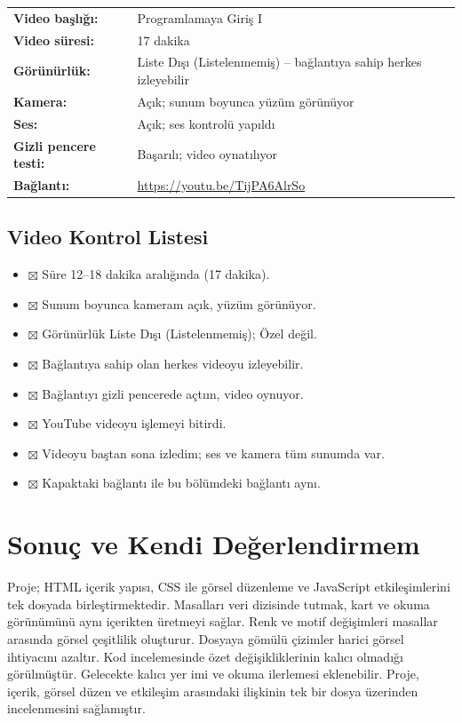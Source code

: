 \documentclass[12pt,a4paper]{article}
\newcommand{\videobasligi}{Programlamaya Giriş I}
\newcommand{\videosuresi}{17 dakika}
\newcommand{\videogorunurlugu}{Liste Dışı (Listelenmemiş) -- bağlantıya sahip herkes izleyebilir}
\newcommand{\youtubelink}{\url{https://youtu.be/TijPA6AlrSo}}
\begin{document}
\begin{center}
\begin{tabular}{@{}lp{9cm}@{}}
\textbf{Video başlığı:} & \videobasligi\\
\textbf{Video süresi:} & \videosuresi\\
\textbf{Görünürlük:} & \videogorunurlugu\\
\textbf{Kamera:} & Açık; sunum boyunca yüzüm görünüyor\\
\textbf{Ses:} & Açık; ses kontrolü yapıldı\\
\textbf{Gizli pencere testi:} & Başarılı; video oynatılıyor\\
\textbf{Bağlantı:} & \youtubelink\\
\end{tabular}
\end{center}

\subsection{Video Kontrol Listesi}
\begin{itemize}[label={}]
\item $\boxtimes$ Süre 12--18 dakika aralığında (17 dakika).
\item $\boxtimes$ Sunum boyunca kameram açık, yüzüm görünüyor.
\item $\boxtimes$ Görünürlük Liste Dışı (Listelenmemiş); Özel değil.
\item $\boxtimes$ Bağlantıya sahip olan herkes videoyu izleyebilir.
\item $\boxtimes$ Bağlantıyı gizli pencerede açtım, video oynuyor.
\item $\boxtimes$ YouTube videoyu işlemeyi bitirdi.
\item $\boxtimes$ Videoyu baştan sona izledim; ses ve kamera tüm sunumda var.
\item $\boxtimes$ Kapaktaki bağlantı ile bu bölümdeki bağlantı aynı.
\end{itemize}

\section{Sonuç ve Kendi Değerlendirmem}
Proje; HTML içerik yapısı, CSS ile görsel düzenleme ve JavaScript etkileşimlerini tek dosyada birleştirmektedir. Masalları veri dizisinde tutmak, kart ve okuma görünümünü aynı içerikten üretmeyi sağlar. Renk ve motif değişimleri masallar arasında görsel çeşitlilik oluşturur. Dosyaya gömülü çizimler harici görsel ihtiyacını azaltır. Kod incelemesinde özet değişikliklerinin kalıcı olmadığı görülmüştür. Gelecekte kalıcı yer imi ve okuma ilerlemesi eklenebilir. Proje, içerik, görsel düzen ve etkileşim arasındaki ilişkinin tek bir dosya üzerinden incelenmesini sağlamıştır.
\end{document}
